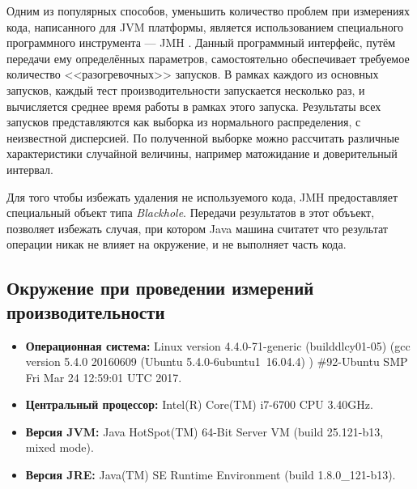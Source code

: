 Одним из популярных способов, уменьшить количество проблем при измерениях кода, написанного для JVM платформы, является использованием специального программного инструмента --- JMH \cite{java:jmh}. Данный программный интерфейс, путём передачи ему определённых параметров, самостоятельно обеспечивает требуемое количество <<разогревочных>> запусков. В рамках каждого из основных запусков, каждый тест производительности запускается несколько раз, и вычисляется среднее время работы в рамках этого запуска. Результаты всех запусков представляются как выборка из нормального распределения, с неизвестной дисперсией. По полученной выборке можно рассчитать различные характеристики случайной величины, например матожидание и доверительный интервал.

Для того чтобы избежать удаления не используемого кода, JMH предоставляет специальный объект типа \textit{Blackhole}. Передачи результатов в этот объъект, позволяет избежать случая, при котором Java машина считатет что результат операции никак не влияет на окружение, и не выполняет часть кода.

\subsection{Окружение при проведении измерений производительности}

\begin{itemize}
    \item \textbf{Операционная система:} Linux version 4.4.0-71-generic (buildd\at lcy01-05) (gcc version 5.4.0 20160609 (Ubuntu 5.4.0-6ubuntu1~16.04.4) ) \#92-Ubuntu SMP Fri Mar 24 12:59:01 UTC 2017.
    \item \textbf{Центральный процессор:}  Intel(R) Core(TM) i7-6700 CPU \at 3.40GHz.
    \item \textbf{Версия JVM:}  Java HotSpot(TM) 64-Bit Server VM (build 25.121-b13, mixed mode).
    \item \textbf{Версия JRE:}  Java(TM) SE Runtime Environment (build 1.8.0\_121-b13).
\end{itemize}